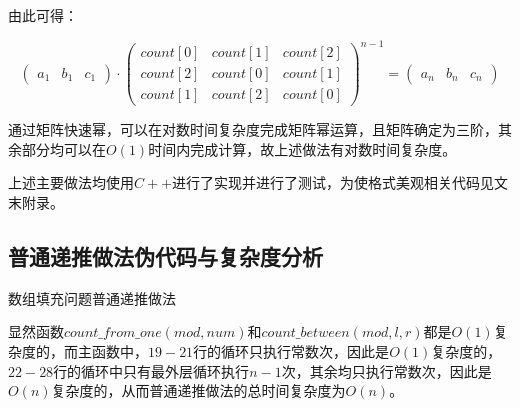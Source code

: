 \documentclass{article}
\begin{document}
由此可得：

$$
\begin{pmatrix}
    a_1&b_1&c_1
\end{pmatrix}
\cdot
\begin{pmatrix}
    count[0]&count[1]&count[2]\\
    count[2]&count[0]&count[1]\\
    count[1]&count[2]&count[0]
\end{pmatrix}
^{n-1}
=
\begin{pmatrix}
    a_n&b_n&c_n
\end{pmatrix}
$$

通过矩阵快速幂，可以在对数时间复杂度完成矩阵幂运算，且矩阵确定为三阶，其余部分均可以在$O(1)$时间内完成计算，故上述做法有对数时间复杂度。

上述主要做法均使用$C++$进行了实现并进行了测试，为使格式美观相关代码见文末附录。

\subsection{普通递推做法伪代码与复杂度分析}

\begin{algorithm}[H]

\caption{数组填充问题普通递推做法}
\LinesNumbered
{}




\end{algorithm}

显然函数$count\_from\_one(mod,num)$和$count\_between(mod,l,r)$都是$O(1)$复杂度的，而主函数中，$19-21$行的循环只执行常数次，因此是$O(1)$复杂度的，$22-28$行的循环中只有最外层循环执行$n-1$次，其余均只执行常数次，因此是$O(n)$复杂度的，从而普通递推做法的总时间复杂度为$O(n)$。
\end{document}
